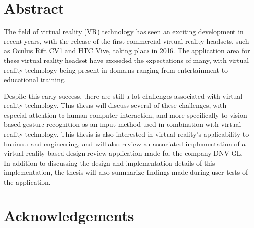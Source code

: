 \chapter*{Abstract}                    

The field of virtual reality (VR) technology has seen an exciting development in recent years, 
with the release of the first commercial virtual reality headsets, such as Oculus Rift CV1 and HTC Vive, taking place in 2016.
The application area for these virtual reality headset have exceeded the expectations of many, with virtual reality 
technology being present in domains ranging from entertainment to educational training.

Despite this early success, there are still a lot challenges associated with virtual reality technology. This thesis will discuss several of these challenges, 
with especial attention to human-computer interaction, and more specifically to vision-based gesture recognition as an input method used in combination with virtual reality technology. 
This thesis is also interested in virtual reality's applicability to business and engineering, and will also review an associated implementation of a virtual reality-based 
design review application made for the company DNV GL. In addition to discussing the design and implementation details of this implementation, the thesis will also summarize 
findings made during user tests of the application. 

\chapter*{Acknowledgements}  

